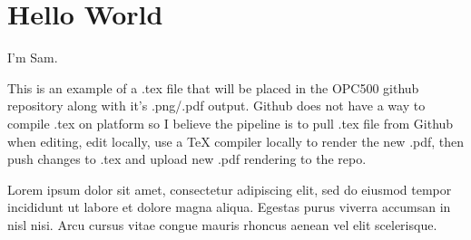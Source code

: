 \documentclass{article}
\begin{document}
\section{Hello World} 

I'm Sam.

This is an example of a .tex file that will be placed in the OPC500 github repository along with it's .png/.pdf output. Github does not have a way to compile .tex on platform so I believe the pipeline is to pull .tex file from Github when editing, edit locally, use a TeX compiler locally to render the new .pdf, then push changes to .tex and upload new .pdf rendering to the repo.

 Lorem ipsum dolor sit amet, consectetur adipiscing elit, sed do eiusmod tempor incididunt ut labore et dolore magna aliqua. Egestas purus viverra accumsan in nisl nisi. Arcu cursus vitae congue mauris rhoncus aenean vel elit scelerisque. 
\end{document}
